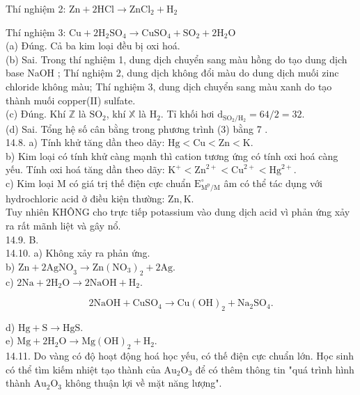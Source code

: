 \documentclass[10pt]{article}
\begin{document}
Thí nghiệm 2: $\mathrm{Zn}+2 \mathrm{HCl} \rightarrow \mathrm{ZnCl}_{2}+\mathrm{H}_{2}$

Thí nghiệm 3: $\mathrm{Cu}+2 \mathrm{H}_{2} \mathrm{SO}_{4} \rightarrow \mathrm{CuSO}_{4}+\mathrm{SO}_{2}+2 \mathrm{H}_{2} \mathrm{O}$\\
(a) Đúng. Cả ba kim loại đều bị oxi hoá.\\
(b) Sai. Trong thí nghiệm 1, dung dịch chuyển sang màu hồng do tạo dung dịch base NaOH ; Thí nghiệm 2, dung dịch không đổi màu do dung dịch muối zinc chloride không màu; Thí nghiệm 3, dung dịch chuyển sang màu xanh do tạo thành muối copper(II) sulfate.\\
(c) Đúng. Khí $\mathbb{Z}$ là $\mathrm{SO}_{2}$, khí $\mathbb{X}$ là $\mathrm{H}_{2}$. Tỉ khối hơi $\mathrm{d}_{\mathrm{SO}_{2} / \mathrm{H}_{2}}=64 / 2=32$.\\
(d) Sai. Tổng hệ số cân bằng trong phương trình (3) bằng 7 .\\
14.8. a) Tính khử tăng dần theo dãy: $\mathrm{Hg}<\mathrm{Cu}<\mathrm{Zn}<\mathrm{K}$.\\
b) Kim loại có tính khử càng mạnh thì cation tương ứng có tính oxi hoá càng yếu. Tính oxi hoá tăng dần theo dãy: $\mathrm{K}^{+}<\mathrm{Zn}^{2+}<\mathrm{Cu}^{2+}<\mathrm{Hg}^{2+}$.\\
c) Kim loại M có giá trị thế điện cực chuẩn $\mathrm{E}_{\mathrm{M}^{\mathrm{p}} / \mathrm{M}}^{\circ}$ âm có thể tác dụng với hydrochloric acid ở điều kiện thường: $\mathrm{Zn}, \mathrm{K}$.\\
Tuy nhiên KHÔNG cho trực tiếp potassium vào dung dịch acid vì phản ứng xảy ra rất mãnh liệt và gây nổ.\\
14.9. B.\\
14.10. a) Không xảy ra phản ứng.\\
b) $\mathrm{Zn}+2 \mathrm{AgNO}_{3} \rightarrow \mathrm{Zn}\left(\mathrm{NO}_{3}\right)_{2}+2 \mathrm{Ag}$.\\
c) $2 \mathrm{Na}+2 \mathrm{H}_{2} \mathrm{O} \rightarrow 2 \mathrm{NaOH}+\mathrm{H}_{2}$.

$$
2 \mathrm{NaOH}+\mathrm{CuSO}_{4} \rightarrow \mathrm{Cu}(\mathrm{OH})_{2}+\mathrm{Na}_{2} \mathrm{SO}_{4} .
$$

d) $\mathrm{Hg}+\mathrm{S} \rightarrow \mathrm{HgS}$.\\
e) $\mathrm{Mg}+2 \mathrm{H}_{2} \mathrm{O} \rightarrow \mathrm{Mg}(\mathrm{OH})_{2}+\mathrm{H}_{2}$.\\
14.11. Do vàng có độ hoạt động hoá học yếu, có thế điện cực chuẩn lớn. Học sinh có thể tìm kiếm nhiệt tạo thành của $\mathrm{Au}_{2} \mathrm{O}_{3}$ để có thêm thông tin "quá trình hình thành $\mathrm{Au}_{2} \mathrm{O}_{3}$ không thuận lợi về mặt năng lượng".
\end{document}
